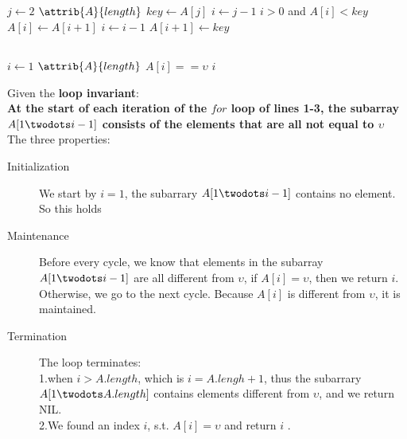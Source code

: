 \documentclass[paper=a4, fontsize=11pt,oneside]{book} %
\numberwithin{equation}{section} %
\numberwithin{figure}{section} %
\numberwithin{table}{section} %
\begin{document}
		\subsection{}
			\begin{codebox}
				\li \For $j \gets 2$ \To $\attrib{A}{length}$
				\li \Do
							$key \gets A[j]$
				\li 		$i \gets j-1$
				\li			\While $i > 0 $ and $A[i] < key$
				\li			\Do
									$A[i] \gets  A[i+1]$
				\li					$i \gets i - 1$
							\End
				\li 		$A[i+1] \gets key$
				   \End
				\end{codebox}
				
		\subsection{}
			\begin{codebox}
				\Procname{$\proc{Linear-Search}(A, \upsilon)$}
				\li \For $i \gets 1$ \To $\attrib{A}{length}$
				\li \Do
							\If $A[i] == \upsilon$
				\li			\Do
								\Return $i$
							\End
					\End
				\li \Return \const{NIL}
			\end{codebox}
			Given the \textbf{loop invariant}:\\
			\textbf{At the start of each iteration of the $for$ loop of lines 1-3, the subarray
				$A[1 \twodots i - 1]$ consists of the elements that are all not equal to $\upsilon$}			\\
		   The three properties:
		   \begin{description}
		   	\item[Initialization] We start by $i = 1$, the subarrary $A[1 \twodots i - 1]$ contains no element. So this holds
		   	\item[Maintenance] Before every cycle, we know that elements in the subarray $A[1 \twodots i - 1]$ are all different from $\upsilon$, if $A[i] = \upsilon$, then we return $i$.
		   	Otherwise, we go to the next cycle. Because $A[i]$ is different from $\upsilon$, it is maintained.
		   	\item[Termination] The loop terminates: \\
		   	1.when $i > A.length$, which is $ i = A.lengh + 1$,
		   	thus the subarrary $A[1 \twodots A.length]$ contains elements different from $\upsilon$,
		   	and we return NIL. \\
		   	2.We found an index $i$, s.t. $A[i] = \upsilon$ and return $i$ .
		   \end{description}
\end{document}
